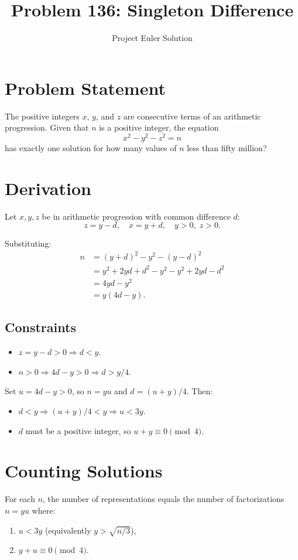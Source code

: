 \documentclass[12pt]{article}
\title{Problem 136: Singleton Difference}
\author{Project Euler Solution}
\date{}
\begin{document}
\maketitle

\section{Problem Statement}
The positive integers $x$, $y$, and $z$ are consecutive terms of an arithmetic progression. Given that $n$ is a positive integer, the equation
\[
x^2 - y^2 - z^2 = n
\]
has exactly one solution for how many values of $n$ less than fifty million?

\section{Derivation}

Let $x, y, z$ be in arithmetic progression with common difference $d$:
\[
z = y - d, \quad x = y + d, \quad y > 0, \; z > 0.
\]

Substituting:
\begin{align*}
n &= (y+d)^2 - y^2 - (y-d)^2 \\
  &= y^2 + 2yd + d^2 - y^2 - y^2 + 2yd - d^2 \\
  &= 4yd - y^2 \\
  &= y(4d - y).
\end{align*}

\subsection{Constraints}
\begin{itemize}
\item $z = y - d > 0 \Rightarrow d < y$.
\item $n > 0 \Rightarrow 4d - y > 0 \Rightarrow d > y/4$.
\end{itemize}

Set $u = 4d - y > 0$, so $n = yu$ and $d = (u+y)/4$. Then:
\begin{itemize}
\item $d < y \Rightarrow (u+y)/4 < y \Rightarrow u < 3y$.
\item $d$ must be a positive integer, so $u + y \equiv 0 \pmod{4}$.
\end{itemize}

\section{Counting Solutions}
For each $n$, the number of representations equals the number of factorizations $n = yu$ where:
\begin{enumerate}
\item $u < 3y$ (equivalently $y > \sqrt{n/3}$),
\item $y + u \equiv 0 \pmod{4}$.
\end{enumerate}
\end{document}
